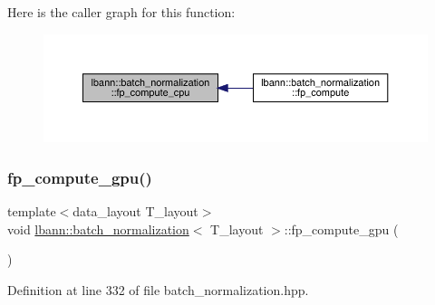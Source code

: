 Here is the caller graph for this function\+:\nopagebreak
\begin{figure}[H]
\begin{center}
\leavevmode
\includegraphics[width=350pt]{classlbann_1_1batch__normalization_ae4cad47f456752e4ea20add0f6f38819_icgraph}
\end{center}
\end{figure}
\mbox{\label{classlbann_1_1batch__normalization_aacff2c47a5455a4c28b9695f4fb37249}} 
\subsubsection{\texorpdfstring{fp\+\_\+compute\+\_\+gpu()}{fp\_compute\_gpu()}}
{\footnotesize\ttfamily template$<$data\+\_\+layout T\+\_\+layout$>$ \\
void \hyperlink{classlbann_1_1batch__normalization}{lbann\+::batch\+\_\+normalization}$<$ T\+\_\+layout $>$\+::fp\+\_\+compute\+\_\+gpu (\begin{DoxyParamCaption}{ }\end{DoxyParamCaption})\hspace{0.3cm}{\ttfamily [inline]}}



Definition at line 332 of file batch\+\_\+normalization.\+hpp.


